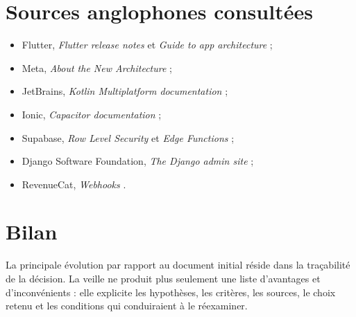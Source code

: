 \section*{Sources anglophones consultées}

\begin{itemize}
  \item Flutter, \textit{Flutter release notes} et \textit{Guide to app architecture} \cite{flutter-releases,flutter-architecture} ;
  \item Meta, \textit{About the New Architecture} \cite{react-native-new-architecture} ;
  \item JetBrains, \textit{Kotlin Multiplatform documentation} \cite{kotlin-multiplatform} ;
  \item Ionic, \textit{Capacitor documentation} \cite{capacitor-docs} ;
  \item Supabase, \textit{Row Level Security} et \textit{Edge Functions} \cite{supabase-rls,supabase-edge-functions} ;
  \item Django Software Foundation, \textit{The Django admin site} \cite{django-admin} ;
  \item RevenueCat, \textit{Webhooks} \cite{revenuecat-webhooks}.
\end{itemize}

\section*{Bilan}

La principale évolution par rapport au document initial réside dans la traçabilité de la décision. La veille ne produit plus seulement une liste d'avantages et d'inconvénients : elle explicite les hypothèses, les critères, les sources, le choix retenu et les conditions qui conduiraient à le réexaminer.
